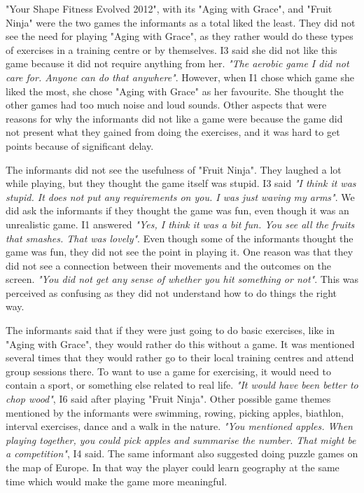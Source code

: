 "Your Shape Fitness Evolved 2012", with its "Aging with Grace", and "Fruit Ninja" were the two games the informants as a total liked the least. They did not see the need for playing "Aging with Grace", as they rather would do these types of exercises in a training centre or by themselves. I3 said she did not like this game because it did not require anything from her. \emph{"The aerobic game I did not care for. Anyone can do that anywhere"}. However, when I1 chose which game she liked the most, she chose "Aging with Grace" as her favourite. She thought the other games had too much noise and loud sounds. Other aspects that were reasons for why the informants did not like a game were because the game did not present what they gained from doing the exercises, and it was hard to get points because of significant delay. 

The informants did not see the usefulness of "Fruit Ninja". They laughed a lot while playing, but they thought the game itself was stupid. I3 said \emph{"I think it was stupid. It does not put any requirements on you. I was just waving my arms"}. We did ask the informants if they thought the game was fun, even though it was an unrealistic game. I1 answered \emph{"Yes, I think it was a bit fun. You see all the fruits that smashes. That was lovely"}. Even though some of the informants thought the game was fun, they did not see the point in playing it. One reason was that they did not see a connection between their movements and the outcomes on the screen. \emph{"You did not get any sense of whether you hit something or not"}. This was perceived as confusing as they did not understand how to do things the right way. 

The informants said that if they were just going to do basic exercises, like in "Aging with Grace", they would rather do this without a game. It was mentioned several times that they would rather go to their local training centres and attend group sessions there. To want to use a game for exercising, it would need to contain a sport, or something else related to real life. \emph{"It would have been better to chop wood"}, I6 said after playing "Fruit Ninja". Other possible game themes mentioned by the informants were swimming, rowing, picking apples, biathlon, interval exercises, dance and a walk in the nature. \emph{"You mentioned apples. When playing together, you could pick apples and summarise the number. That might be a competition"}, I4 said. The same informant also suggested doing puzzle games on the map of Europe. In that way the player could learn geography at the same time which would make the game more meaningful.

